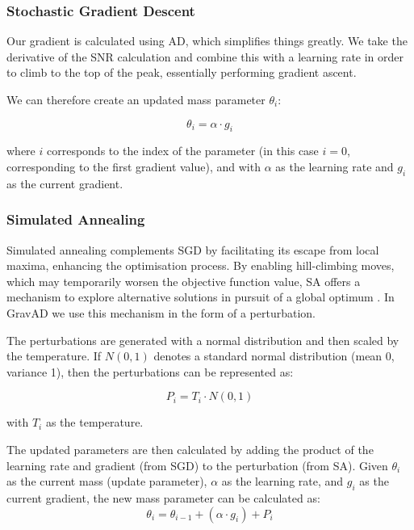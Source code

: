 \documentclass[twocolumn, aps, pra]{revtex4-2}
\begin{document}
	\subsubsection{Stochastic Gradient Descent}
	
	Our gradient is calculated using AD, which simplifies things greatly. We take the derivative of the SNR calculation and combine this with a learning rate in order to climb to the top of the peak, essentially performing gradient ascent.
	
	We can therefore create an updated mass parameter $\theta_i$:
	
	\begin{equation}
		\theta_i = \alpha \cdot g_i
	\end{equation}
	
	where $i$ corresponds to the index of the parameter (in this case $i=0$, corresponding to the first gradient value), and with $\alpha$ as the learning rate and $g_i$ as the current gradient.
	
	\subsubsection{Simulated Annealing}
	
	Simulated annealing complements SGD by facilitating its escape from local maxima, enhancing the optimisation process. By enabling hill-climbing moves, which may temporarily worsen the objective function value, SA offers a mechanism to explore alternative solutions in pursuit of a global optimum \cite{SA}. In GravAD we use this mechanism in the form of a perturbation.
	
	The perturbations are generated with a normal distribution and then scaled by the temperature. If $N(0,1)$ denotes a standard normal distribution (mean 0, variance 1), then the perturbations can be represented as:
	
	\begin{equation}
		P_i = T_i \cdot N(0,1)
	\end{equation}
	
	with $T_i$ as the temperature.
	
	The updated parameters are then calculated by adding the product of the learning rate and gradient (from SGD) to the perturbation (from SA). Given $\theta_i$ as the current mass (update parameter), $\alpha$ as the learning rate, and $g_i$ as the current gradient, the new mass parameter can be calculated as:
	\begin{equation}
		\theta_{i} = \theta_{i-1} + \left(\alpha \cdot g_i \right)+ P_i
	\end{equation}
	
\end{document}

